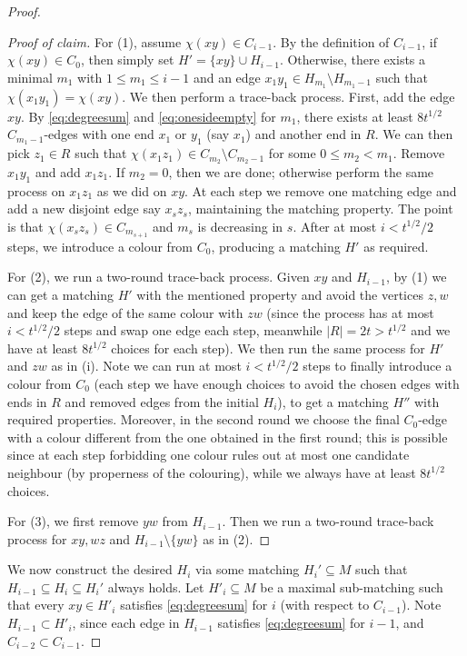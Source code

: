\documentclass[11pt,reqno]{amsart}
\newenvironment{poc}{\begin{proof}[Proof of claim]\renewcommand*{\qedsymbol}{$\blacksquare$}}{\end{proof}}
\theoremstyle{definition}
\theoremstyle{remark}
\renewcommand\leq{\leqslant}
\begin{document}
\begin{proof}
\begin{poc}
For (1), assume $\chi(xy)\in C_{i-1}$. By the definition of $C_{i-1}$, if $\chi(xy)\in C_0$, then simply set $H'=\{xy\}\cup H_{i-1}$. Otherwise, there exists a minimal $m_1$ with $1\leq m_1\leq i-1$ and an edge $x_1y_1\in H_{m_1}\setminus H_{m_1-1}$ such that $\chi(x_1y_1)=\chi(xy)$. We then perform a trace-back process. First, add the edge $xy$. By \eqref{eq:degreesum} and \eqref{eq:onesideempty} for $m_1$, there exists at least $8t^{1/2}$ $C_{m_1-1}$-edges with one end $x_1$ or $y_1$ (say $x_1$) and another end in $R$. We can then pick $z_1\in R$ such that $\chi(x_1z_1)\in C_{m_2}\setminus C_{m_2-1}$ for some $0\leq m_2<m_1$.
Remove $x_1y_1$ and add $x_1z_1$. If $m_2=0$, then we are done; otherwise perform the same process on $x_1z_1$ as we did on $xy$. At each step we remove one matching edge and add a new disjoint edge say $x_sz_s$, maintaining the matching property. The point is that $\chi(x_sz_s)\in C_{m_{s+1}}$ and $m_s$ is decreasing in $s$.  After at most $i<t^{1/2}/2$ steps, we introduce a colour from $C_0$, producing a matching $H'$ as required.

For (2), we run a two-round trace-back process. Given $xy$ and $H_{i-1}$, by (1) we can get a matching $H'$ with the mentioned property and avoid the vertices $z,w$ and keep the edge of the same colour with $zw$ (since the process has at most $i<t^{1/2}/2$ steps and swap one edge each step, meanwhile $|R|=2t> t^{1/2}$ and we have at least $8t^{1/2}$ choices for each step). We then run the same process for $H'$ and $zw$ as in (i). Note we can run at most $i<t^{1/2}/2$ steps to finally introduce a colour from $C_0$ (each step we have enough choices to avoid the chosen edges with ends in $R$ and removed edges from the initial $H_i$), to get a matching $H''$ with required properties. Moreover, in the second round we choose the final $C_0$-edge with a colour different from the one obtained in the first round; this is possible since at each step forbidding one colour rules out at most one candidate neighbour (by properness of the colouring), while we always have at least $8t^{1/2}$ choices. 

For (3), we first remove $yw$ from $H_{i-1}$. Then we run a two-round trace-back process for $xy,wz$ and $H_{i-1}\setminus\{yw\}$ as in (2).
\end{poc}


We now construct the desired $H_i$ via some matching $H_i'\subseteq M$ such that $H_{i-1}\subseteq H_i\subseteq H_i'$ always holds. Let $H'_i\subseteq M$ be a maximal sub-matching such that every $xy\in H'_i$ satisfies \eqref{eq:degreesum} for $i$ (with respect to $C_{i-1}$).
Note $H_{i-1}\subset H'_i$, since each edge in $H_{i-1}$ satisfies \eqref{eq:degreesum} for $i-1$, and $C_{i-2}\subset C_{i-1}$.  


\end{proof}
\end{document}

